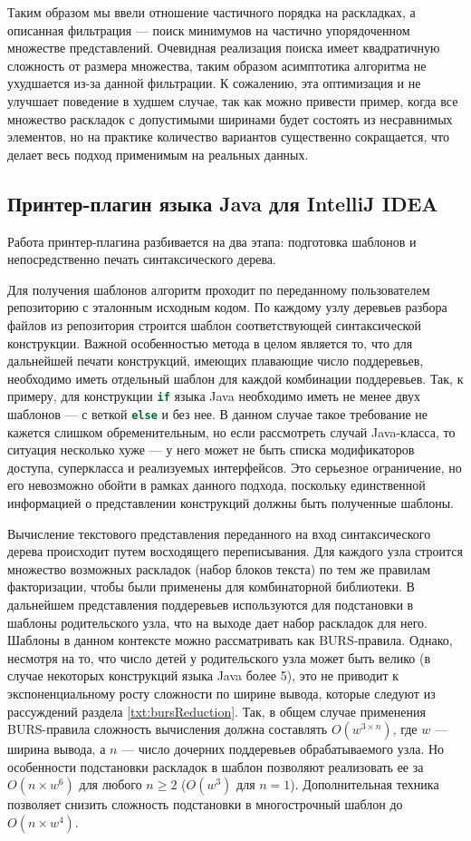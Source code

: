 Таким образом мы ввели отношение частичного порядка на раскладках, а
описанная фильтрация --- поиск минимумов на частично упорядоченном
множестве представлений\cite{poset}.
Очевидная реализация поиска имеет квадратичную сложность от размера множества,
таким образом асимптотика алгоритма не ухудшается из-за данной фильтрации.
К сожалению, эта оптимизация и не улучшает поведение
в худшем случае, так как
можно привести пример, когда все множество раскладок с допустимыми ширинами
будет состоять из несравнимых элементов, но на практике количество вариантов
существенно сокращается, что делает весь подход применимым на реальных данных.

\newpage
\subsection{Принтер-плагин языка Java для IntelliJ IDEA}

Работа принтер-плагина разбивается на два этапа: подготовка шаблонов и непосредственно
печать синтаксического дерева.

Для получения шаблонов алгоритм проходит по переданному пользователем репозиторию с
эталонным исходным кодом. По каждому узлу деревьев разбора файлов из репозитория
строится шаблон соответствующей синтаксической конструкции. Важной особенностью
метода в целом
является то, что для дальнейшей печати конструкций, имеющих плавающие число
поддеревьев, необходимо иметь отдельный шаблон для каждой комбинации поддеревьев.
Так, к примеру, для конструкции \lstinline[language = Java]{if} языка Java
необходимо иметь не менее двух шаблонов --- с веткой \lstinline[language = Java]{else}
и без нее. В данном случае такое требование не кажется слишком обременительным, но
если рассмотреть случай Java-класса, то ситуация несколько хуже --- у него может не
быть списка модификаторов доступа, суперкласса и реализуемых интерфейсов.
Это серьезное ограничение, но его невозможно обойти в рамках данного подхода,
поскольку единственной информацией о представлении конструкций должны быть
полученные шаблоны.

Вычисление текстового представления переданного на вход синтаксического
дерева происходит путем восходящего переписывания. Для каждого узла строится множество
возможных раскладок (набор блоков текста) по тем же правилам факторизации, чтобы были
применены для комбинаторной библиотеки. В дальнейшем представления поддеревьев
используются для подстановки в шаблоны родительского узла, что на выходе дает
набор раскладок для него. Шаблоны в данном контексте можно рассматривать как
BURS-правила. Однако, несмотря на то, что число детей у родительского узла может
быть велико (в случае некоторых конструкций языка Java более 5),
это не приводит к экспоненциальному росту сложности по ширине вывода, которые
следуют из рассуждений раздела \ref{txt:bursReduction}. Так, в общем случае применения
BURS-правила сложность вычисления должна составлять $O(w^{3 \times n})$, где $w$ ---
ширина вывода, а $n$ --- число дочерних поддеревьев обрабатываемого узла. Но
особенности подстановки раскладок в шаблон позволяют реализовать ее
за $O(n \times w^{6})$ для любого $n \geq 2$ ($O(w^{3})$ для $n = 1$).
Дополнительная техника позволяет снизить сложность подстановки в многострочный шаблон
до $O(n \times w^{4})$.

